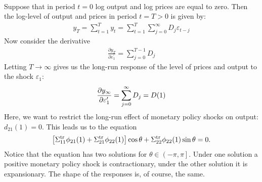 \begin{eg}
\begin{align*}
    \end{align*}
    Suppose that in period $t = 0$ log output and log prices are equal to zero.
    Then the log-level of output and prices in period $t = T > 0$ is given by:
    \begin{gather*}
        y_T = \sum_{t=1}^{T}y_t = \sum_{t=1}^{T} \sum_{j=0}^{\infty} D_j \varepsilon_{t-j}
    \end{gather*}
    Now consider the derivative
    \begin{gather*}
        \frac{\partial y_T}{\partial \varepsilon_1^{\prime}} = \sum_{j=0}^{T-1} D_j
    \end{gather*}
    Letting $T \to \infty$ gives us the long-run response of the level of prices and output to the shock $\varepsilon_1$:
    \begin{gather*}
        \frac{\partial y_\infty}{\partial \varepsilon_1^{\prime}} = \sum_{j=0}^{\infty} D_j = D(1)
    \end{gather*}
    Here, we want to restrict the long-run effect of monetary policy shocks on output: $d_{21}(1) = 0$.
    This leads us to the equation
    \begin{gather*}
        \left[\Sigma_{11}^{\operatorname{tr}}\phi_{21}(1) + \Sigma_{21}^{\operatorname{tr}}\phi_{22}(1) \right]\cos \theta + \Sigma_{22}^{\operatorname{tr}}\phi_{22}(1) \sin \theta = 0.
    \end{gather*}
    Notice that the equation has two solutions for $\theta \in \left(-\pi, \pi \right].$
    Under one solution a positive monetary policy shock is contractionary,
    under the other solution it is expansionary.
    The shape of the responses is, of course, the same.
\end{eg}